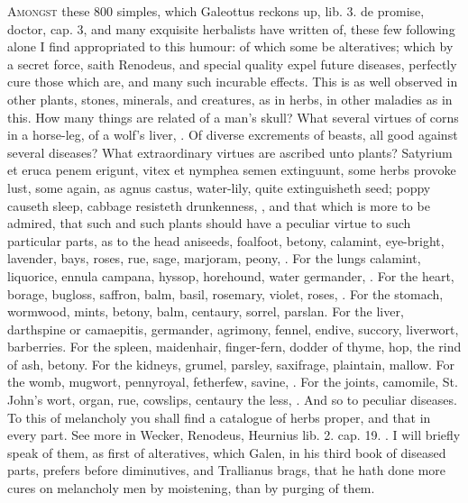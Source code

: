 {\lettrine{A}{mongst} these 800 simples, which Galeottus reckons up, lib. 3. de
promise, doctor, cap. 3, and many exquisite herbalists have written of,
these few following alone I find appropriated to this humour: of which
some be alteratives; which by a secret force, saith Renodeus, and
special quality expel future diseases, perfectly cure those which are,
and many such incurable effects. This is as well observed in other
plants, stones, minerals, and creatures, as in herbs, in other maladies
as in this. How many things are related of a man's skull? What several
virtues of corns in a horse-leg, of a wolf's liver, \etc{}. Of
diverse excrements of beasts, all good against several diseases?
What extraordinary virtues are ascribed unto plants? Satyrium et
eruca penem erigunt, vitex et nymphea semen extinguunt, some
herbs provoke lust, some again, as agnus castus, water-lily, quite
extinguisheth seed; poppy causeth sleep, cabbage resisteth drunkenness,
\etc{}, and that which is more to be admired, that such and such plants
should have a peculiar virtue to such particular parts, as to the
head aniseeds, foalfoot, betony, calamint, eye-bright, lavender, bays,
roses, rue, sage, marjoram, peony, \etc{}. For the lungs calamint,
liquorice, ennula campana, hyssop, horehound, water germander, \etc{}. For
the heart, borage, bugloss, saffron, balm, basil, rosemary, violet,
roses, \etc{}. For the stomach, wormwood, mints, betony, balm, centaury,
sorrel, parslan. For the liver, darthspine or camaepitis, germander,
agrimony, fennel, endive, succory, liverwort, barberries. For the
spleen, maidenhair, finger-fern, dodder of thyme, hop, the rind of ash,
betony. For the kidneys, grumel, parsley, saxifrage, plaintain, mallow.
For the womb, mugwort, pennyroyal, fetherfew, savine, \etc{}. For the
joints, camomile, St. John's wort, organ, rue, cowslips, centaury the
less, \etc{}. And so to peculiar diseases. To this of melancholy you shall
find a catalogue of herbs proper, and that in every part. See more in
Wecker, Renodeus, Heurnius lib. 2. cap. 19. \etc{}. I will briefly speak of
them, as first of alteratives, which Galen, in his third book of
diseased parts, prefers before diminutives, and Trallianus brags, that
he hath done more cures on melancholy men by moistening, than by
purging of them.

}
